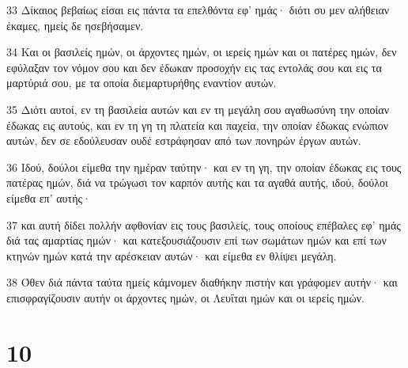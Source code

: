 \par 33 Δίκαιος βεβαίως είσαι εις πάντα τα επελθόντα εφ' ημάς· διότι συ μεν αλήθειαν έκαμες, ημείς δε ησεβήσαμεν.
\par 34 Και οι βασιλείς ημών, οι άρχοντες ημών, οι ιερείς ημών και οι πατέρες ημών, δεν εφύλαξαν τον νόμον σου και δεν έδωκαν προσοχήν εις τας εντολάς σου και εις τα μαρτύριά σου, με τα οποία διεμαρτυρήθης εναντίον αυτών.
\par 35 Διότι αυτοί, εν τη βασιλεία αυτών και εν τη μεγάλη σου αγαθωσύνη την οποίαν έδωκας εις αυτούς, και εν τη γη τη πλατεία και παχεία, την οποίαν έδωκας ενώπιον αυτών, δεν σε εδούλευσαν ουδέ εστράφησαν από των πονηρών έργων αυτών.
\par 36 Ιδού, δούλοι είμεθα την ημέραν ταύτην· και εν τη γη, την οποίαν έδωκας εις τους πατέρας ημών, διά να τρώγωσι τον καρπόν αυτής και τα αγαθά αυτής, ιδού, δούλοι είμεθα επ' αυτής·
\par 37 και αυτή δίδει πολλήν αφθονίαν εις τους βασιλείς, τους οποίους επέβαλες εφ' ημάς διά τας αμαρτίας ημών· και κατεξουσιάζουσιν επί των σωμάτων ημών και επί των κτηνών ημών κατά την αρέσκειαν αυτών· και είμεθα εν θλίψει μεγάλη.
\par 38 Όθεν διά πάντα ταύτα ημείς κάμνομεν διαθήκην πιστήν και γράφομεν αυτήν· και επισφραγίζουσιν αυτήν οι άρχοντες ημών, οι Λευΐται ημών και οι ιερείς ημών.

\chapter{10}

